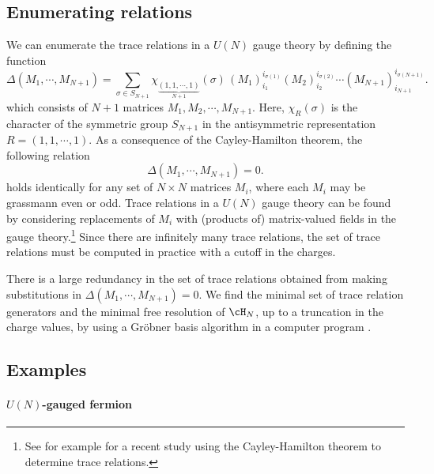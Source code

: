 \documentclass[a4paper,12pt]{article}
\begin{document}
\subsection{Enumerating relations} \label{subsec:enumeraterelations}

We can enumerate the trace relations in a $U(N)$ gauge theory by defining the function \cite{Concini:2017}
\begin{equation}
\Delta (M_1,\cdots,M_{N+1}) = \sum_{\sigma \in S_{N+1}} \chi_{\underbrace{\scriptstyle (1,1,\cdots,1)}_{N+1}} (\sigma) \, (M_1)_{i_1}^{i_{\sigma(1)}} (M_2)_{i_2}^{i_{\sigma(2)}} \cdots (M_{N+1})_{i_{N+1}}^{i_{\sigma(N+1)}}.
\end{equation}
which consists of $N+1$ matrices $M_1, M_2, \cdots, M_{N+1}$. Here, $\chi_R(\sigma)$ is the character of the symmetric group $S_{N+1}$ in the antisymmetric representation $R=(1,1,\cdots,1)$. As a consequence of the Cayley-Hamilton theorem, the following relation
\begin{equation}
\Delta (M_1,\cdots,M_{N+1}) = 0.
\end{equation}
holds identically for any set of $N \times N$ matrices $M_i$, where each $M_i$ may be grassmann even or odd. Trace relations in a $U(N)$ gauge theory can be found by considering replacements of $M_i$ with (products of) matrix-valued fields in the gauge theory.\footnote{See for example \cite{Dempsey:2022uie} for a recent study using the Cayley-Hamilton theorem to determine trace relations.} Since there are infinitely many trace relations, the set of trace relations must be computed in practice with a cutoff in the charges.

There is a large redundancy in the set of trace relations obtained from making substitutions in $\Delta (M_1,\cdots,M_{N+1}) = 0$. We find the minimal set of trace relation generators and the minimal free resolution of $\cH_N$, up to a truncation in the charge values, by using a Gr\"{o}bner basis algorithm in a computer program \cite{M2}.


\subsection{Examples} \label{subsec:examples}

\paragraph{$U(N)$-gauged fermion}
\end{document}
